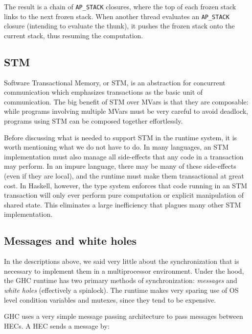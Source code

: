 The result is a chain of \verb|AP_STACK| closures, where the top of each
frozen stack links to the next frozen stack.  When another thread
evaluates an \verb|AP_STACK| closure (intending to evaluate the thunk),
it pushes the frozen stack onto the current stack, thus resuming the
computation.

\subsection{STM}

Software Transactional Memory, or STM, is an abstraction for concurrent
communication which emphasizes transactions as the basic unit of
communication.  The big benefit of STM over MVars is that they are
composable: while programs involving multiple MVars must be very careful
to avoid deadlock, programs using STM can be composed together
effortlessly.

Before discussing what is needed to support STM in the runtime system,
it is worth mentioning what we do not have to do.  In many languages,
an STM implementation must also manage all side-effects that any code
in a transaction may perform.  In an impure language, there may be many
of these side-effects (even if they are local), and the runtime must
make them transactional at great cost.  In Haskell, however, the type system
enforces that code running in an STM transaction will only ever perform
pure computation or explicit manipulation of shared state.  This eliminates
a large inefficiency that plagues many other STM implementation.



\subsection{Messages and white holes}

In the descriptions above, we said very little about the synchronization
that is necessary to implement them in a multiprocessor environment.
Under the hood, the GHC runtime has two primary methods of synchronization:
\emph{messages} and \emph{white holes} (effectively a spinlock).  The
runtime makes very sparing use of OS level condition variables and
mutexes, since they tend to be expensive.

GHC uses a very simple message passing architecture to pass messages
between HECs.  A HEC sends a message by:

